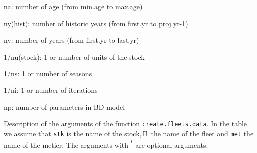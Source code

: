\begin{landscape}
\begin{table}[!ht]
\begin{footnotesize}
\begin{threeparttable}
      \begin{tablenotes}
        \item na: number of age (from min.age to max.age)
        \item ny(hist): number of historic years (from first.yr to proj.yr-1)
        \item ny: number of years (from first.yr to last.yr)
        \item 1/nu(stock): 1 or number of units of the stock
        \item 1/ns: 1 or number of seasons
        \item 1/ni:  1 or number of iterations
        \item np: number of parameters in BD model
      \end{tablenotes}
      
    \end{threeparttable}
  \end{footnotesize}

\end{table}	


	
\begin{table}[!ht]

  \centering
  \begin{footnotesize}
    
    \caption{Description of the arguments of the function \texttt{create.fleets.data}. 
      In the table we assume that \texttt{stk} is the name of the stock,\texttt{fl} the name of the fleet and \texttt{met} the name of the metier. 
      The arguments with \textsuperscript{*} are optional arguments.}
    
    \label{tb:A4.table4}
    
    \begin{threeparttable}
    

\end{threeparttable}
\end{footnotesize}
\end{table}
\end{landscape}
